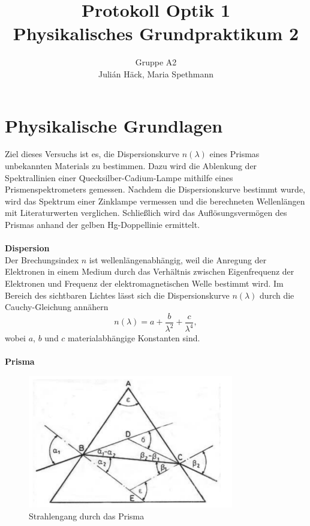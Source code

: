 \documentclass[12pt,a4paper]{article}
\author{Gruppe A2 \\ Julián Häck, Maria Spethmann}
\title{Protokoll Optik 1 \\ Physikalisches Grundpraktikum 2}
\begin{document}
	\maketitle
	\thispagestyle{empty} %
	\newpage
	\pagestyle{headings} %
	\tableofcontents
	\newpage


\section{Physikalische Grundlagen}

Ziel dieses Versuchs ist es, die Dispersionskurve $n(\lambda)$ eines Prismas unbekannten Materials zu bestimmen. Dazu wird die Ablenkung der Spektrallinien einer Quecksilber-Cadium-Lampe mithilfe eines Prismenspektrometers gemessen. Nachdem die Dispersionskurve bestimmt wurde, wird das Spektrum einer Zinklampe vermessen und die berechneten Wellenlängen mit Literaturwerten verglichen. Schließlich wird das Auflösungsvermögen des Prismas anhand der gelben Hg-Doppellinie ermittelt.\\\\
\textbf{Dispersion}\\
Der Brechungsindex $n$ ist wellenlängenabhängig, weil die Anregung der Elektronen in einem Medium durch das Verhältnis zwischen Eigenfrequenz der Elektronen und Frequenz der elektromagnetischen Welle bestimmt wird. Im Bereich des sichtbaren Lichtes lässt sich die Dispersionskurve $n(\lambda)$ durch die Cauchy-Gleichung annähern
\begin{equation}\label{eq:Cauchy-Gleichung}
n(\lambda)=a+\frac{b}{\lambda^2}+\frac{c}{\lambda^4},
\end{equation}
wobei $a$, $b$ und $c$ materialabhängige Konstanten sind.\\\\
\textbf{Prisma}
\begin{figure}[H]
	\centering
	\includegraphics[width=0.8\textwidth]{Bilder/Prisma_Strahlengang.png}
	\caption{Strahlengang durch das Prisma}
	\label{Prisma_Strahlengang}
\end{figure}
\end{document}
